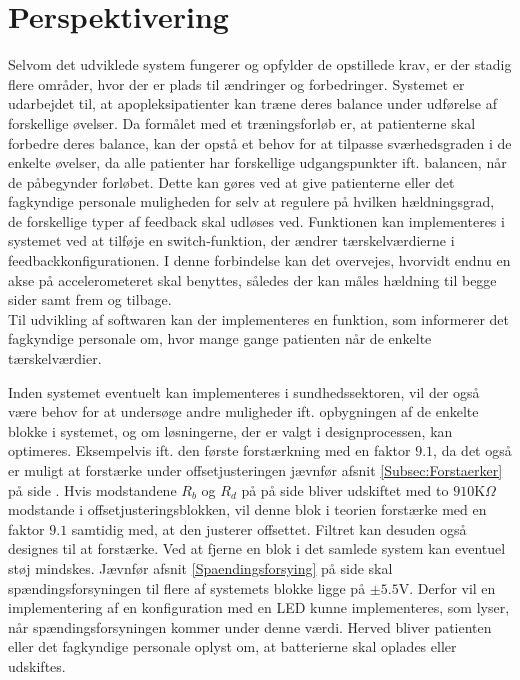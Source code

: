 \section{Perspektivering}
Selvom det udviklede system fungerer og opfylder de opstillede krav, er der stadig flere områder, hvor der er plads til ændringer og forbedringer. 
Systemet er udarbejdet til, at apopleksipatienter kan træne deres balance under udførelse af forskellige øvelser. Da formålet med et træningsforløb er, at patienterne skal forbedre deres balance, kan der opstå et behov for at tilpasse sværhedsgraden i de enkelte øvelser, da alle patienter har forskellige udgangspunkter ift. balancen, når de påbegynder forløbet. Dette kan gøres ved at give patienterne eller det fagkyndige personale muligheden for selv at regulere på hvilken hældningsgrad, de forskellige typer af feedback skal udløses ved. Funktionen kan implementeres i systemet ved at tilføje en switch-funktion, der ændrer tærskelværdierne i feedbackkonfigurationen. %
I denne forbindelse kan det overvejes, hvorvidt endnu en akse på accelerometeret skal benyttes, således der kan måles hældning til begge sider samt frem og tilbage. \\
Til udvikling af softwaren kan der implementeres en funktion, som informerer det fagkyndige personale om, hvor mange gange patienten når de enkelte tærskelværdier.   

Inden systemet eventuelt kan implementeres i sundhedssektoren, vil der også være behov for at undersøge andre muligheder ift. opbygningen af de enkelte blokke i systemet, og om løsningerne, der er valgt i designprocessen, kan optimeres. Eksempelvis ift. den første forstærkning med en faktor $9.1$, da det også er muligt at forstærke under offsetjusteringen jævnfør afsnit \ref{Subsec:Forstaerker} på side \pageref{Subsec:Forstaerker}. Hvis modstandene $R_{b}$ og $R_{d}$ på  på side \pageref{fig:Forstaerker_faktor18} bliver udskiftet med to $910$K$\Omega$ modstande  i offsetjusteringsblokken, vil denne blok i teorien forstærke med en faktor $9.1$ samtidig med, at den justerer offsettet. Filtret kan desuden også designes til at forstærke. Ved at fjerne en blok i det samlede system kan eventuel støj mindskes. Jævnfør afsnit \ref{Spaendingsforsying} på side \pageref{Spaendingsforsying} skal spændingsforsyningen til flere af systemets blokke ligge på $\pm5.5$V. Derfor vil en implementering af en konfiguration med en LED kunne implementeres, som lyser, når spændingsforsyningen kommer under denne værdi. Herved bliver patienten eller det fagkyndige personale oplyst om, at batterierne skal oplades eller udskiftes.

